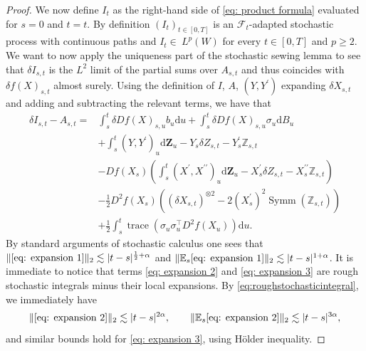\documentclass[11pt,a4paper]{article}
\newcommand{\rd}{\mathrm{d}}
\theoremstyle{plain}
\begin{document}
\begin{proof}
    We now define $I_{t}$ as the right-hand side of \eqref{eq: product formula} evaluated for $s=0$ and $t=t$. By definition $(I_t)_{t\in [0,T]}$ is an $\mathcal{F}_t$-adapted stochastic process with continuous paths and $I_t \in~L^p(W)$ for every $t\in[0,T]$ and $p\geq 2$. We want to now apply the uniqueness part of the stochastic sewing lemma to see that $\delta I_{s,t}$ is the $L^2$ limit of the partial sums over $A_{s,t}$ and thus coincides with $\delta f(X)_{s,t}$ almost surely.
    Using the definition of $I$, $A$, $(Y,Y^\prime)$ expanding $\delta X_{s,t}$ and adding and subtracting the relevant terms, we have that
    \begin{align}
        \delta I_{s,t} - A_{s,t} 
        = &\int_{s}^{t} \delta Df(X)_{s,u} b_u \rd u
        + \int_{s}^{t} \delta Df(X)_{s,u} \sigma_u \rd B_u
        \label{eq: expansion 1}\\
        &+ \int_{s}^{t} (Y,Y^{\prime})_u\rd \mathbf{Z}_u
        - Y_s \delta Z_{s,t} - Y_s^{\prime} \mathbb{Z}_{s,t}
        \label{eq: expansion 2}\\
        & - Df(X_s) \left(\int_{s}^t (X^\prime, X^{\prime\prime})_u \rd \mathbf{Z}_u - X^{\prime}_s \delta Z_{s,t} - X^{\prime \prime}_s \mathbb{Z}_{s,t}
        \right)
        \label{eq: expansion 3}
        \\
        & -\frac{1}{2} D^2f(X_s) \left( (\delta X_{s,t})^{\otimes 2} - 2 (X^{\prime}_s)^2 \operatorname{Symm}(\mathbb{Z}_{s,t})\right)
        \label{eq: expansion 4}\\
         &+ \frac{1}{2} \int_{s}^{t}\operatorname{trace}(\sigma_u \sigma^{\top}_u D^2f(X_u)) \rd u.
         \label{eq: expansion 5}
    \end{align}
    By standard arguments of stochastic calculus one sees that $\|\eqref{eq: expansion 1}\|_{2} \lesssim |t-s|^{\frac{1}{2} + \alpha}$ and $\|\mathbb{E}_s\eqref{eq: expansion 1}\|_{2} \lesssim |t-s|^{1 + \alpha}$. It is immediate to notice that terms \eqref{eq: expansion 2} and \eqref{eq: expansion 3} are rough stochastic integrals minus their local expansions. By \eqref{eq:roughstochasticintegral}, we immediately have
    \begin{equation*}
        \|\eqref{eq: expansion 2}\|_{2} \lesssim |t-s|^{2\alpha}, \qquad \|\mathbb{E}_s\eqref{eq: expansion 2}\|_{2} \lesssim |t-s|^{3\alpha},
    \end{equation*}
    and similar bounds hold for \eqref{eq: expansion 3}, using Hölder inequality.


\end{proof}
\end{document}
